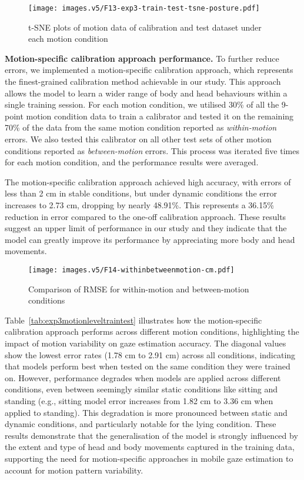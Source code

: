 \begin{figure}[!htbp]
    \centering
    \texttt{[image: images.v5/F13-exp3-train-test-tsne-posture.pdf]}
    \caption{t-SNE plots of motion data of calibration and test dataset under each motion condition }
    \label{fig:overall-US3-train-test-motion}
\end{figure}

\noindent\textbf{Motion-specific calibration approach performance.} 
To further reduce errors, we implemented a motion-specific calibration approach, which represents the finest-grained calibration method achievable in our study. This approach allows the model to learn a wider range of body and head behaviours within a single training session. For each motion condition, we utilised 30\% of all the 9-point motion condition data to train a calibrator and tested it on the remaining 70\% of the data from the same motion condition reported as \textit{within-motion} errors. We also tested this calibrator on all other test sets of other motion conditions reported as \textit{between-motion} errors. This process was iterated five times for each motion condition, and the performance results were averaged.


The motion-specific calibration approach achieved high accuracy, with errors of less than 2 cm in stable conditions, but under dynamic conditions the error increases to 2.73 cm, dropping by nearly 48.91\%. This represents a 36.15\% reduction in error compared to the one-off calibration approach. These results suggest an upper limit of performance in our study and they indicate that the model can greatly improve its performance by appreciating more body and head movements.


\begin{figure}[!htbp]
\centering
\texttt{[image: images.v5/F14-withinbetweenmotion-cm.pdf]}
\caption{Comparison of RMSE for within-motion and between-motion conditions}
\label{fig:exp3textlevelacc}
\end{figure}

Table~\ref{tab:exp3motionleveltraintest} illustrates how the motion-specific calibration approach performs across different motion conditions, highlighting the impact of motion variability on gaze estimation accuracy. The diagonal values show the lowest error rates (1.78 cm to 2.91 cm) across all conditions, indicating that models perform best when tested on the same condition they were trained on. However, performance degrades when models are applied across different conditions, even between seemingly similar static conditions like sitting and standing (e.g., sitting model error increases from 1.82 cm to 3.36 cm when applied to standing). This degradation is more pronounced between static and dynamic conditions, and particularly notable for the lying condition. These results demonstrate that the generalisation of the model is strongly influenced by the extent and type of head and body movements captured in the training data, supporting the need for motion-specific approaches in mobile gaze estimation to account for motion pattern variability.

